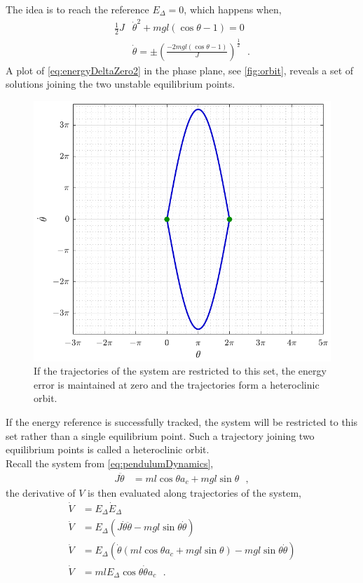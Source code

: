 The idea is to reach the reference $E_\Delta = 0$, which happens when,
\begin{align}
  \tfrac{1}{2} J &\dot{\theta}^2 + m g l (\cos \theta -1) = 0 \label{eq:energyDeltaZero1} \\
  &\dot{\theta} = \pm \left(\frac{-2 m g l (\cos \theta -1)}{J}\right)^{\tfrac{1}{2}}  \ \ \ .  \label{eq:energyDeltaZero2}
\end{align}
%
A plot of \autoref{eq:energyDeltaZero2} in the phase plane, see \autoref{fig:orbit}, reveals a set of solutions joining the two unstable equilibrium points.
%
\begin{figure}[H]
  \includegraphics[width=.4\textwidth]{figures/orbit}
  \caption{If the trajectories of the system are restricted to this set, the energy error is maintained at zero and the trajectories form a heteroclinic orbit.}
  \label{fig:orbit}
\end{figure}
%
If the energy reference is successfully tracked, the system will be restricted to this set rather than a single equilibrium point. Such a trajectory joining two equilibrium points is called a heteroclinic orbit.\\
Recall the system from \autoref{eq:pendulumDynamics},
\begin{align}
  J \ddot{\theta} &= m l \cos \theta a_c + m g l \sin \theta \ \ \ ,  \label{eq:pendulumDynamics2}
\end{align}
the derivative of $V$ is then evaluated along trajectories of the system,
\begin{align}
  \dot{V} &= E_\Delta \dot{E}_\Delta %
  \label{eq:lyapunovDerivative1} \\ 
  \dot{V} &= E_\Delta ( J \dot{\theta} \ddot{\theta} - m g l \sin \theta \dot{\theta} )   \label{eq:lyapunovDerivative2} \\
  \dot{V} &= E_\Delta ( \dot{\theta} ( m l \cos \theta a_c + m g l \sin \theta )  - m g l \sin \theta \dot{\theta} )   \label{eq:lyapunovDerivative3} \\
  \dot{V} &= m l E_\Delta \cos \theta \dot{\theta} a_c   \ \ \ .  \label{eq:lyapunovDerivative4}
\end{align}
